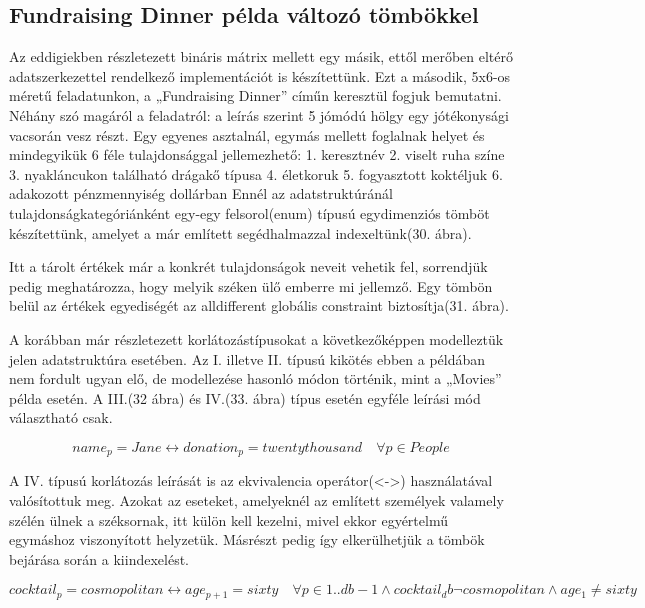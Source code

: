 \documentclass[12pt,a4paper,twoside, openright]{report}
\begin{document}
\subsection{Fundraising Dinner példa változó tömbökkel}

    Az eddigiekben részletezett bináris mátrix mellett egy másik, ettől merőben eltérő adatszerkezettel rendelkező implementációt is készítettünk.
    Ezt a második, 5x6-os méretű feladatunkon, a „Fundraising Dinner” címűn keresztül fogjuk bemutatni.
    Néhány szó magáról a feladatról: a leírás szerint 5 jómódú hölgy egy jótékonysági vacsorán vesz részt.
    Egy egyenes asztalnál, egymás mellett foglalnak helyet és mindegyikük 6 féle tulajdonsággal jellemezhető:
    1. keresztnév
    2. viselt ruha színe
    3. nyakláncukon található drágakő típusa
    4.	életkoruk
    5. fogyasztott koktéljuk
    6. adakozott pénzmennyiség dollárban
    Ennél az adatstruktúránál tulajdonságkategóriánként egy-egy felsorol(enum) típusú egydimenziós tömböt készítettünk, amelyet a már említett segédhalmazzal indexeltünk(30. ábra).


    Itt a tárolt értékek már a konkrét tulajdonságok neveit vehetik fel, sorrendjük pedig meghatározza, hogy melyik széken ülő emberre mi jellemző.
    Egy tömbön belül az értékek egyediségét az alldifferent globális constraint biztosítja(31. ábra).


    A korábban már részletezett korlátozástípusokat a következőképpen modelleztük jelen adatstruktúra esetében.
    Az I. illetve II. típusú kikötés ebben a példában nem fordult ugyan elő, de modellezése hasonló módon történik, mint a „Movies” példa esetén.
    A III.(32 ábra) és IV.(33. ábra) típus esetén egyféle leírási mód választható csak.

    \begin{equation}
    name_p=Jane \leftrightarrow donation_p=twentythousand \quad \forall p \in People
    \end{equation}

    A IV. típusú korlátozás leírását is az ekvivalencia operátor(<->) használatával valósítottuk meg.
    Azokat az eseteket, amelyeknél az említett személyek valamely szélén ülnek a széksornak, itt külön kell kezelni, mivel ekkor egyértelmű egymáshoz viszonyított helyzetük.
    Másrészt pedig így elkerülhetjük a tömbök bejárása során a 
    kiindexelést.

	\begin{equation}
	cocktail_p=cosmopolitan \leftrightarrow age_{p+1}=sixty \quad \forall p \in 1..db-1
	\wedge cocktail_db \neg cosmopolitan \wedge age_1 \neq sixty 
	\end{equation}
\end{document}

